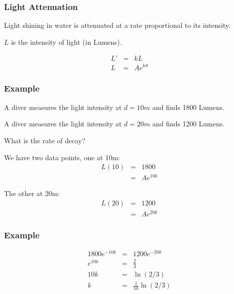 \begin{frame}
  \frametitle{Light Attenuation}

  Light shining in water is attenuated at a rate proportional to its
  intensity.

  $L$ is the intensity of light (in Lumens).

  \begin{eqnarray*}
    L' & = & k L \\
    L & = & A e^{kd}
  \end{eqnarray*}


\end{frame}

\begin{frame}
  \frametitle{Example}
  
  A diver measures the light intensity at $d=10m$ and finds 1800
  Lumens.

  A diver measures the light intensity at $d=20m$ and finds 1200
  Lumens.

  What is the rate of decay?

  {
    We have two data points, one at 10m:
    \begin{eqnarray*}
      L(10) & = & 1800 \\
      & = & A e^{10k} 
    \end{eqnarray*}


    The other at 20m:
    \begin{eqnarray*}
      L(20) & = & 1200 \\
      & = & A e^{20k}
    \end{eqnarray*}

  }

\end{frame}

\begin{frame}
  \frametitle{Example}

  \begin{eqnarray*}
    1800 e^{-10k} & = & 1200 e^{-20k} \\
    e^{10k} & = & \frac{2}{3} \\
    10k & = & \ln(2/3) \\
    k & = & \frac{1}{10} \ln(2/3)
  \end{eqnarray*}

\end{frame}


